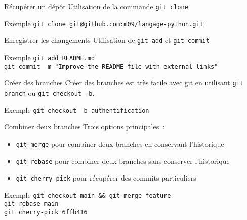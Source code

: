\begin{frame}{Récupérer un dépôt}
  Utilisation de la commande \texttt{git clone}

  \begin{exampleblock}{Exemple}
    \texttt{git clone git@github.com:m09/langage-python.git}
  \end{exampleblock}
\end{frame}

\begin{frame}{Enregistrer les changements}
  Utilisation de \texttt{git add} et \texttt{git commit}

  \begin{exampleblock}{Exemple}
    \texttt{git add README.md}\\
    \texttt{git commit -m "Improve the README file with external links"}
  \end{exampleblock}
\end{frame}

\begin{frame}{Créer des branches}
  Créer des branches est très facile avec git en utilisant \texttt{git branch} ou \texttt{git checkout -b}.

  \begin{exampleblock}{Exemple}
    \texttt{git checkout -b authentification}
  \end{exampleblock}
\end{frame}

\begin{frame}{Combiner deux branches}
  Trois options principales~:

  \begin{itemize}[<+->]
    \item \texttt{git merge} pour combiner deux branches en conservant l'historique
    \item \texttt{git rebase} pour combiner deux branches sans conserver l'historique
    \item \texttt{git cherry-pick} pour récupérer des commits particuliers
  \end{itemize}

  \begin{exampleblock}{Exemple}
    \texttt{git checkout main \&\& git merge feature}\\
    \texttt{git rebase main}\\
    \texttt{git cherry-pick 6ffb416}
  \end{exampleblock}
\end{frame}

